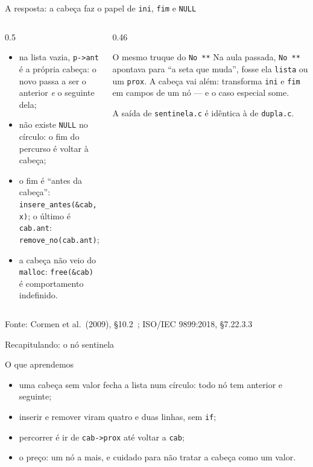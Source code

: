 \documentclass[aspectratio=169]{beamer}
\newcommand{\fonte}[1]{\vfill\hfill{\scriptsize\textcolor{UFSGray}{Fonte: #1}}}
\begin{document}
\begin{frame}{A resposta: a cabeça faz o papel de \texttt{ini}, \texttt{fim} e \texttt{NULL}}
  \begin{columns}[T]
    \begin{column}{0.5\textwidth}
      \small
      \begin{itemize}
        \item na lista vazia, \texttt{p->ant} é a própria cabeça: o novo
          passa a ser o anterior \emph{e} o seguinte dela;
        \item não existe \texttt{NULL} no círculo: o fim do percurso é
          voltar à cabeça;
        \item o fim é ``antes da cabeça'':
          \texttt{insere\_antes(\&cab, x)}; o último é \texttt{cab.ant}:
          \texttt{remove\_no(cab.ant)};
        \item a cabeça não veio do \texttt{malloc}: \texttt{free(\&cab)} é
          comportamento indefinido.
      \end{itemize}
    \end{column}
    \begin{column}{0.46\textwidth}
      \begin{block}{O mesmo truque do \texttt{No **}}
        \small Na aula passada, \texttt{No **} apontava para ``a seta
        que muda'', fosse ela \texttt{lista} ou um \texttt{prox}. A
        cabeça vai além: transforma \texttt{ini} e \texttt{fim} em campos
        de um nó --- e o caso especial some.
      \end{block}
      \small A saída de \texttt{sentinela.c} é idêntica à de
      \texttt{dupla.c}.
    \end{column}
  \end{columns}
  \fonte{Cormen et al.\ (2009), §10.2~\cite{cormen2009introduction};
    ISO/IEC 9899:2018, §7.22.3.3~\cite{iso2018c17}}
\end{frame}

\begin{frame}{Recapitulando: o nó sentinela}
  \begin{block}{O que aprendemos}
    \begin{itemize}
      \item uma cabeça sem valor fecha a lista num círculo: todo nó tem
        anterior e seguinte;
      \item inserir e remover viram quatro e duas linhas, sem \texttt{if};
      \item percorrer é ir de \texttt{cab->prox} até voltar a
        \texttt{cab};
      \item o preço: um nó a mais, e cuidado para não tratar a cabeça como
        um valor.
    \end{itemize}
  \end{block}
\end{frame}
\end{document}
